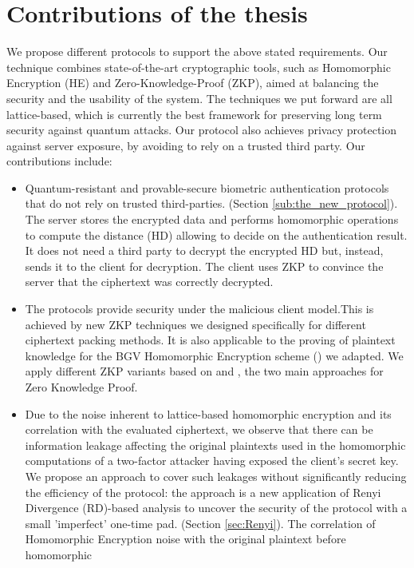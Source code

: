 \section{Contributions of the thesis}
\label{sec:thesisContributions}
We propose different protocols to support the above stated requirements. Our
technique combines state-of-the-art cryptographic tools, such as Homomorphic
Encryption (HE) and Zero-Knowledge-Proof (ZKP), aimed at balancing the security and the usability
of the system. The techniques we put forward are all lattice-based, which is currently the best
framework for preserving long term security against quantum attacks. Our protocol also
achieves privacy protection against server exposure, by avoiding to rely on a trusted third
party. Our contributions include:
\begin{itemize}
\item Quantum-resistant and provable-secure biometric authentication protocols
  that do not rely on trusted third-parties. (Section
  \ref{sub:the_new_protocol}). The server stores the encrypted data and performs
  homomorphic operations to compute the distance (HD) allowing to decide on the
  authentication result. It does not need a third party to decrypt the encrypted
  HD but, instead, sends it to the client for decryption. The client uses ZKP to
  convince the server that the ciphertext was correctly decrypted.
\item The protocols provide security under the malicious client model.This is achieved
  by new ZKP techniques we designed specifically for different ciphertext
  packing methods. It is also applicable to the proving of plaintext knowledge for
  the BGV Homomorphic Encryption scheme (\cite{brakerski2011fully}) we
  adapted. We apply different ZKP variants based on \cite{stern1993new} and
  \cite{schnorr1989efficient}, the two main approaches for Zero
  Knowledge Proof.
\item Due to the noise inherent to lattice-based homomorphic encryption and
  its correlation with the evaluated ciphertext, we observe that there can be
  information leakage affecting the original plaintexts used in the homomorphic
  computations of a two-factor attacker having exposed the client's secret key. We
  propose an approach to cover such leakages without significantly reducing the
  efficiency of the protocol: the approach is a new application of Renyi
  Divergence (RD)-based analysis to uncover the security of the protocol with a
  small 'imperfect' one-time pad. (Section \ref{sec:Renyi}). The correlation of
  Homomorphic Encryption noise with the original plaintext before homomorphic

\end{itemize}
